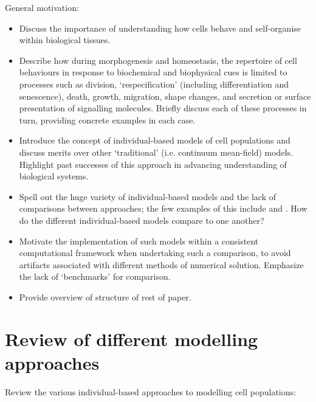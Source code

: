 \documentclass[12pt]{article}
\begin{document}
General motivation:
\begin{itemize}
\item Discuss the importance of understanding how cells behave and self-organise within biological tissues.
\item Describe how during morphogenesis and homeostasis, the repertoire of cell behaviours in response to biochemical and biophysical cues is limited to processes such as division, `respecification' (including differentiation and senescence), death, growth, migration, shape changes, and secretion or surface presentation of signalling molecules. Briefly discuss each of these processes in turn, providing concrete examples in each case.
\item Introduce the concept of individual-based models of cell populations and discuss merits over other `traditional' (i.e. continuum mean-field) models. Highlight past successes of this approach in advancing understanding of biological systems.
\item Spell out the huge variety of individual-based models and the lack of comparisons between approaches; the few examples of this include \citet{Galle2006Individual} and \citet{Osborne2010Hybrid}. How do the different individual-based models compare to one another?
\item Motivate the implementation of such models within a consistent computational framework when undertaking such a comparison, to avoid artifacts associated with different methods of numerical solution. Emphasize the lack of `benchmarks' for comparison.
\item Provide overview of structure of rest of paper.
\end{itemize}


\section{Review of different modelling approaches}\label{sec:discrete_models}

Review the various individual-based approaches to modelling cell populations:
\end{document}
